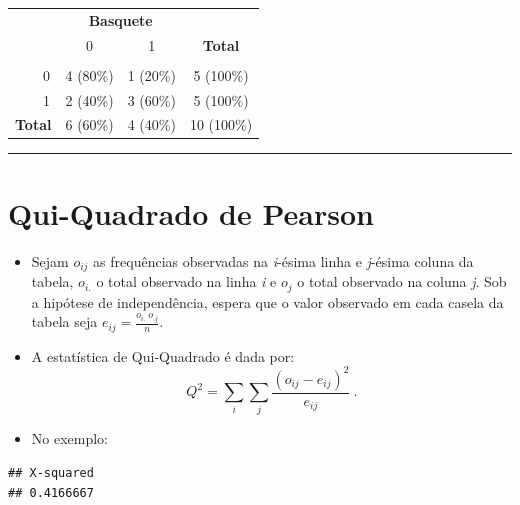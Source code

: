 \documentclass[
]{book}
\newenvironment{Shaded}{\begin{snugshade}}{\end{snugshade}}
\newcommand{\FunctionTok}[1]{\textcolor[rgb]{0.13,0.29,0.53}{\textbf{#1}}}
\newcommand{\NormalTok}[1]{#1}
\newcommand{\OtherTok}[1]{\textcolor[rgb]{0.56,0.35,0.01}{#1}}
\newcommand{\SpecialCharTok}[1]{\textcolor[rgb]{0.81,0.36,0.00}{\textbf{#1}}}
\begin{document}
\begin{table}[t]
\fontsize{12.0pt}{14.4pt}\selectfont
\begin{tabular*}{\linewidth}{@{\extracolsep{\fill}}lccc}
\toprule
 & \multicolumn{2}{c}{\textbf{Basquete}} &  \\ 
\cmidrule(lr){2-3}
 & 0 & 1 & \textbf{Total} \\ 
\midrule\addlinespace[2.5pt]
{\bfseries Camisa} &  &  &  \\ 
    0 & 4 (80\%) & 1 (20\%) & 5 (100\%) \\ 
    1 & 2 (40\%) & 3 (60\%) & 5 (100\%) \\ 
{\bfseries Total} & 6 (60\%) & 4 (40\%) & 10 (100\%) \\ 
\bottomrule
\end{tabular*}
\end{table}

\begin{center}\rule{0.5\linewidth}{0.5pt}\end{center}

\section{Qui-Quadrado de Pearson}\label{qui_quadrado7}

\begin{itemize}
\item
  Sejam \(o_{ij}\) as frequências observadas na \emph{i}-ésima linha e \emph{j}-ésima coluna da tabela, \(o_{i.}\) o total observado na linha \emph{i} e \(o_{j}\) o total observado na coluna \emph{j}. Sob a hipótese de independência, espera que o valor observado em cada casela da tabela seja \(\displaystyle e_{ij} = \frac{o_{i.}~o_{.j}}{n}\).
\item
  A estatística de Qui-Quadrado é dada por:
  \[Q^2 = \sum_i \sum_j \frac{(o_{ij}-e_{ij})^2}{e_{ij}}~.\]
\item
  No exemplo:
\end{itemize}

\begin{Shaded}
\end{Shaded}

\begin{verbatim}
## X-squared 
## 0.4166667
\end{verbatim}
\end{document}
